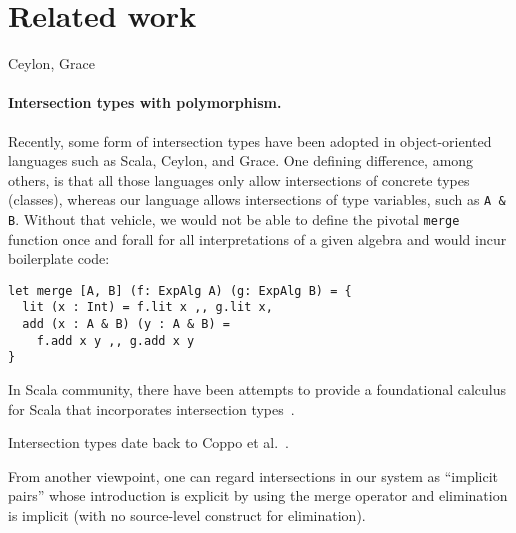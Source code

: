 \section{Related work} \label{sec:related-work}

Ceylon, Grace

\cite{barbanera1995intersection}

\paragraph{Intersection types with polymorphism.}

Recently, some form of intersection types have been adopted in object-oriented
languages such as Scala, Ceylon, and Grace. One defining difference, among
others, is that all those languages only allow intersections of concrete types
(classes), whereas our language allows intersections of type variables, such as
\texttt{A \& B}. Without that vehicle, we would not be able to define the
pivotal \texttt{merge} function once and forall for all interpretations of a
given algebra and would incur boilerplate code:
\begin{verbatim}
let merge [A, B] (f: ExpAlg A) (g: ExpAlg B) = {
  lit (x : Int) = f.lit x ,, g.lit x,
  add (x : A & B) (y : A & B) =
    f.add x y ,, g.add x y
}
\end{verbatim}

In Scala community, there have been attempts to provide a foundational calculus
for Scala that incorporates intersection
types~\cite{amin2014foundations,amin2012dependent}.

Intersection types date back to Coppo et al.~\cite{coppo1981functional}.

From another viewpoint, one can regard intersections in our system as ``implicit
pairs'' whose introduction is explicit by using the merge operator and
elimination is implicit (with no source-level construct for elimination).

